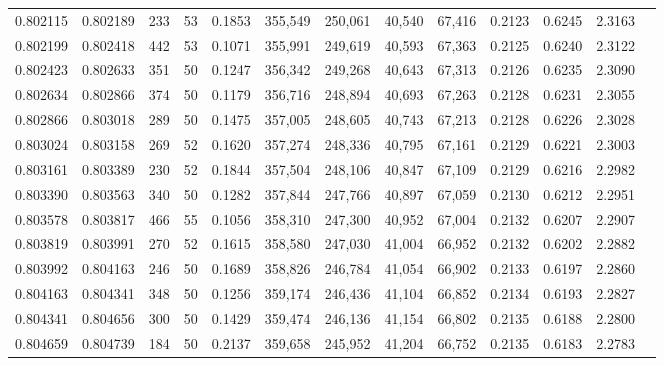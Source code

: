 \begin{tabular}{rrrrrrrrrrrrr}
0.802115 & 0.802189 &   233 &  53 &                                     0.1853 & 355,549 & 250,061 &  40,540 &  67,416 & 0.2123 & 0.6245 & 2.3163 \\
0.802199 & 0.802418 &   442 &  53 &                                     0.1071 & 355,991 & 249,619 &  40,593 &  67,363 & 0.2125 & 0.6240 & 2.3122 \\
0.802423 & 0.802633 &   351 &  50 &                                     0.1247 & 356,342 & 249,268 &  40,643 &  67,313 & 0.2126 & 0.6235 & 2.3090 \\
0.802634 & 0.802866 &   374 &  50 &                                     0.1179 & 356,716 & 248,894 &  40,693 &  67,263 & 0.2128 & 0.6231 & 2.3055 \\
0.802866 & 0.803018 &   289 &  50 &                                     0.1475 & 357,005 & 248,605 &  40,743 &  67,213 & 0.2128 & 0.6226 & 2.3028 \\
0.803024 & 0.803158 &   269 &  52 &                                     0.1620 & 357,274 & 248,336 &  40,795 &  67,161 & 0.2129 & 0.6221 & 2.3003 \\
0.803161 & 0.803389 &   230 &  52 &                                     0.1844 & 357,504 & 248,106 &  40,847 &  67,109 & 0.2129 & 0.6216 & 2.2982 \\
0.803390 & 0.803563 &   340 &  50 &                                     0.1282 & 357,844 & 247,766 &  40,897 &  67,059 & 0.2130 & 0.6212 & 2.2951 \\
0.803578 & 0.803817 &   466 &  55 &                                     0.1056 & 358,310 & 247,300 &  40,952 &  67,004 & 0.2132 & 0.6207 & 2.2907 \\
0.803819 & 0.803991 &   270 &  52 &                                     0.1615 & 358,580 & 247,030 &  41,004 &  66,952 & 0.2132 & 0.6202 & 2.2882 \\
0.803992 & 0.804163 &   246 &  50 &                                     0.1689 & 358,826 & 246,784 &  41,054 &  66,902 & 0.2133 & 0.6197 & 2.2860 \\
0.804163 & 0.804341 &   348 &  50 &                                     0.1256 & 359,174 & 246,436 &  41,104 &  66,852 & 0.2134 & 0.6193 & 2.2827 \\
0.804341 & 0.804656 &   300 &  50 &                                     0.1429 & 359,474 & 246,136 &  41,154 &  66,802 & 0.2135 & 0.6188 & 2.2800 \\
0.804659 & 0.804739 &   184 &  50 &                                     0.2137 & 359,658 & 245,952 &  41,204 &  66,752 & 0.2135 & 0.6183 & 2.2783 \\

\end{tabular}
